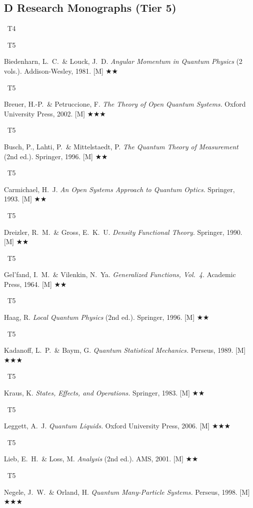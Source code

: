 \documentclass[11pt,a4paper]{article}
\newcommand{\tierbadge}[2]{\colorbox{#1}{\small\bfseries\color{white}\strut\ #2\ }}
\newcommand{\essential}{$\bigstar\bigstar\bigstar$}
\newcommand{\recommended}{$\bigstar\bigstar$}
\begin{document}
\subsection*{D \quad Research Monographs (Tier 5)}
\begin{tcolorbox}[catbox]
\begin{enumerate}[leftmargin=2.5em,label=\textbf{[D\arabic*]},itemsep=3pt]
  \item \tierbadge{t4orange}{T4}\tierbadge{t5red}{T5} Biedenharn, L.~C.\ \& Louck, J.~D. \textit{Angular Momentum in Quantum Physics} (2 vols.). Addison-Wesley, 1981. [M] \recommended
  \item \tierbadge{t5red}{T5} Breuer, H.-P.\ \& Petruccione, F. \textit{The Theory of Open Quantum Systems.} Oxford University Press, 2002. [M] \essential
  \item \tierbadge{t5red}{T5} Busch, P., Lahti, P.\ \& Mittelstaedt, P. \textit{The Quantum Theory of Measurement} (2nd ed.). Springer, 1996. [M] \recommended
  \item \tierbadge{t5red}{T5} Carmichael, H.~J. \textit{An Open Systems Approach to Quantum Optics.} Springer, 1993. [M] \recommended
  \item \tierbadge{t5red}{T5} Dreizler, R.~M.\ \& Gross, E.~K.~U. \textit{Density Functional Theory.} Springer, 1990. [M] \recommended
  \item \tierbadge{t5red}{T5} Gel'fand, I.~M.\ \& Vilenkin, N.~Ya. \textit{Generalized Functions, Vol.~4.} Academic Press, 1964. [M] \recommended
  \item \tierbadge{t5red}{T5} Haag, R. \textit{Local Quantum Physics} (2nd ed.). Springer, 1996. [M] \recommended
  \item \tierbadge{t5red}{T5} Kadanoff, L.~P.\ \& Baym, G. \textit{Quantum Statistical Mechanics.} Perseus, 1989. [M] \essential
  \item \tierbadge{t5red}{T5} Kraus, K. \textit{States, Effects, and Operations.} Springer, 1983. [M] \recommended
  \item \tierbadge{t5red}{T5} Leggett, A.~J. \textit{Quantum Liquids.} Oxford University Press, 2006. [M] \essential
  \item \tierbadge{t5red}{T5} Lieb, E.~H.\ \& Loss, M. \textit{Analysis} (2nd ed.). AMS, 2001. [M] \recommended
  \item \tierbadge{t5red}{T5} Negele, J.~W.\ \& Orland, H. \textit{Quantum Many-Particle Systems.} Perseus, 1998. [M] \essential

\end{enumerate}
\end{tcolorbox}
\end{document}
